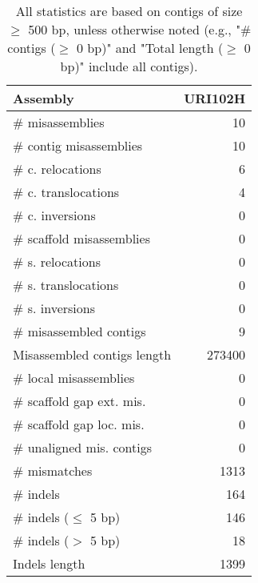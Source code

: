 \documentclass[12pt,a4paper]{article}
\begin{document}
\begin{table}[ht]
\begin{center}
\caption{All statistics are based on contigs of size $\geq$ 500 bp, unless otherwise noted (e.g., "\# contigs ($\geq$ 0 bp)" and "Total length ($\geq$ 0 bp)" include all contigs).}
\begin{tabular}{|l*{1}{|r}|}
\hline
Assembly & URI102H \\ \hline
\# misassemblies & 10 \\ \hline
\hspace{2mm}\# contig misassemblies & 10 \\ \hline
\hspace{5mm}\# c. relocations & 6 \\ \hline
\hspace{5mm}\# c. translocations & 4 \\ \hline
\hspace{5mm}\# c. inversions & 0 \\ \hline
\hspace{2mm}\# scaffold misassemblies & 0 \\ \hline
\hspace{5mm}\# s. relocations & 0 \\ \hline
\hspace{5mm}\# s. translocations & 0 \\ \hline
\hspace{5mm}\# s. inversions & 0 \\ \hline
\# misassembled contigs & 9 \\ \hline
Misassembled contigs length & 273400 \\ \hline
\# local misassemblies & 0 \\ \hline
\# scaffold gap ext. mis. & 0 \\ \hline
\# scaffold gap loc. mis. & 0 \\ \hline
\# unaligned mis. contigs & 0 \\ \hline
\# mismatches & 1313 \\ \hline
\# indels & 164 \\ \hline
\hspace{5mm}\# indels ($\leq$ 5 bp) & 146 \\ \hline
\hspace{5mm}\# indels ($>$ 5 bp) & 18 \\ \hline
Indels length & 1399 \\ \hline
\end{tabular}
\end{center}
\end{table}
\end{document}

